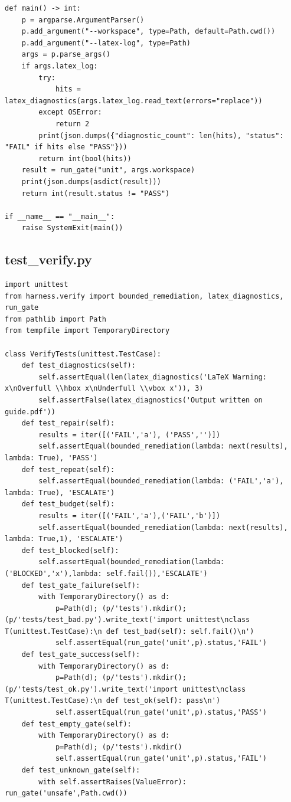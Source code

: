 \documentclass[11pt,letterpaper]{article}
\begin{document}
\begin{lstlisting}
def main() -> int:
    p = argparse.ArgumentParser()
    p.add_argument("--workspace", type=Path, default=Path.cwd())
    p.add_argument("--latex-log", type=Path)
    args = p.parse_args()
    if args.latex_log:
        try:
            hits = latex_diagnostics(args.latex_log.read_text(errors="replace"))
        except OSError:
            return 2
        print(json.dumps({"diagnostic_count": len(hits), "status": "FAIL" if hits else "PASS"}))
        return int(bool(hits))
    result = run_gate("unit", args.workspace)
    print(json.dumps(asdict(result)))
    return int(result.status != "PASS")

if __name__ == "__main__":
    raise SystemExit(main())
\end{lstlisting}
\subsection*{test\_verify.py}
\begin{lstlisting}
import unittest
from harness.verify import bounded_remediation, latex_diagnostics, run_gate
from pathlib import Path
from tempfile import TemporaryDirectory

class VerifyTests(unittest.TestCase):
    def test_diagnostics(self):
        self.assertEqual(len(latex_diagnostics('LaTeX Warning: x\nOverfull \\hbox x\nUnderfull \\vbox x')), 3)
        self.assertFalse(latex_diagnostics('Output written on guide.pdf'))
    def test_repair(self):
        results = iter([('FAIL','a'), ('PASS','')])
        self.assertEqual(bounded_remediation(lambda: next(results), lambda: True), 'PASS')
    def test_repeat(self):
        self.assertEqual(bounded_remediation(lambda: ('FAIL','a'), lambda: True), 'ESCALATE')
    def test_budget(self):
        results = iter([('FAIL','a'),('FAIL','b')])
        self.assertEqual(bounded_remediation(lambda: next(results), lambda: True,1), 'ESCALATE')
    def test_blocked(self):
        self.assertEqual(bounded_remediation(lambda: ('BLOCKED','x'),lambda: self.fail()),'ESCALATE')
    def test_gate_failure(self):
        with TemporaryDirectory() as d:
            p=Path(d); (p/'tests').mkdir(); (p/'tests/test_bad.py').write_text('import unittest\nclass T(unittest.TestCase):\n def test_bad(self): self.fail()\n')
            self.assertEqual(run_gate('unit',p).status,'FAIL')
    def test_gate_success(self):
        with TemporaryDirectory() as d:
            p=Path(d); (p/'tests').mkdir(); (p/'tests/test_ok.py').write_text('import unittest\nclass T(unittest.TestCase):\n def test_ok(self): pass\n')
            self.assertEqual(run_gate('unit',p).status,'PASS')
    def test_empty_gate(self):
        with TemporaryDirectory() as d:
            p=Path(d); (p/'tests').mkdir()
            self.assertEqual(run_gate('unit',p).status,'FAIL')
    def test_unknown_gate(self):
        with self.assertRaises(ValueError): run_gate('unsafe',Path.cwd())
\end{lstlisting}
\end{document}
